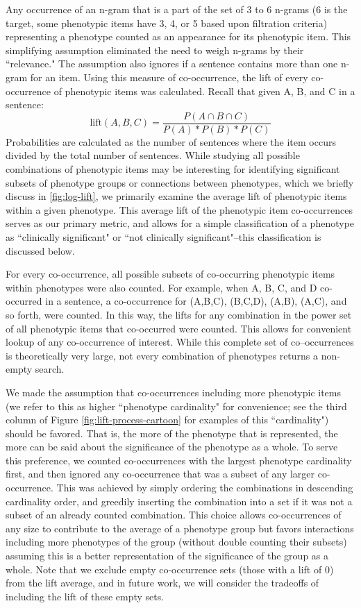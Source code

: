 \documentclass{sig-alternate}
\begin{document}
Any occurrence of an n-gram that is a part of the set of 3 to 6 n-grams (6 is the target, some phenotypic items have 3, 4, or 5 based upon filtration criteria) representing a phenotype counted as an appearance for its phenotypic item.
This simplifying assumption eliminated the need to weigh n-grams by their ``relevance."	
The assumption also ignores if a sentence contains more than one n-gram for an item.
Using this measure of co-occurrence, the lift of every co-occurrence of phenotypic items was calculated. Recall that given A, B, and C in a sentence:
$$ \text{lift}(A,B,C) = \frac {P(A \cap B \cap C)} {P(A)*P(B)*P(C)}  $$
Probabilities are calculated as the number of sentences where the item occurs divided by the total number of sentences.
While studying all possible combinations of phenotypic items may be interesting for identifying significant subsets of phenotype groups or connections between phenotypes, which we briefly discuss in \ref{fig:log-lift}, we primarily examine the average lift of phenotypic items within a given phenotype. This average lift of the phenotypic item co-occurrences serves as our primary metric, and allows for a simple classification of a phenotype as ``clinically significant" or ``not clinically significant"--this classification is discussed below.%

For every co-occurrence, all possible subsets of co-occurring phenotypic items within phenotypes were also counted.
For example, when A, B, C, and D co-occurred in a sentence, a co-occurrence for (A,B,C), (B,C,D), (A,B), (A,C), and so forth, were counted.
In this way, the lifts for any combination in the power set of all phenotypic items that co-occurred were counted.
This allows for convenient lookup of any co-occurrence of interest.
While this complete set of co--occurrences is theoretically very large, not every combination of phenotypes returns a non-empty search.

We made the assumption that co-occurrences including more phenotypic items (we refer to this as higher ``phenotype cardinality" for convenience; see the third column of Figure \ref{fig:lift-process-cartoon} for examples of this ``cardinality") should be favored. That is, the more of the phenotype that is represented, the more can be said about the significance of the phenotype as a whole. 
To serve this preference, we counted co-occurrences with the largest phenotype cardinality first, and then ignored any co-occurrence that was a subset of any larger co-occurrence. This was achieved by simply ordering the combinations in descending cardinality order, and greedily inserting the combination into a set if it was not a subset of an already counted combination. 
This choice allows co-occurrences of any size to contribute to the average of a phenotype group but favors interactions including more phenotypes of the group (without double counting their subsets) assuming this is a better representation of the significance of the group as a whole. Note that we exclude empty co-occurrence sets (those with a lift of 0) from the lift average, and in future work, we will consider the tradeoffs of including the lift of these empty sets.
\end{document}

